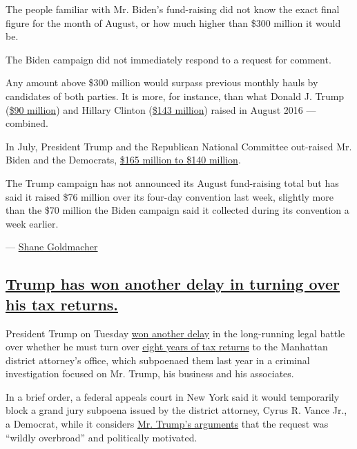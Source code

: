 The people familiar with Mr. Biden's fund-raising did not know the exact
final figure for the month of August, or how much higher than \$300
million it would be.

The Biden campaign did not immediately respond to a request for comment.

Any amount above \$300 million would surpass previous monthly hauls by
candidates of both parties. It is more, for instance, than what Donald
J. Trump
(\href{https://www.politico.com/story/2016/09/trump-august-fundraising-totals-227847}{\$90
million}) and Hillary Clinton
(\href{https://www.nytimes3xbfgragh.onion/2016/09/02/us/politics/hillary-clinton-fundraising.html}{\$143
million}) raised in August 2016 --- combined.

In July, President Trump and the Republican National Committee
out-raised Mr. Biden and the Democrats,
\href{https://www.nytimes3xbfgragh.onion/2020/08/05/us/politics/trump-biden-campaign-finance.html}{\$165
million to \$140 million}.

The Trump campaign has not announced its August fund-raising total but
has said it raised \$76 million over its four-day convention last week,
slightly more than the \$70 million the Biden campaign said it collected
during its convention a week earlier.

--- \href{https://www.nytimes3xbfgragh.onion/by/shane-goldmacher}{Shane
Goldmacher}

\hypertarget{trump-has-won-another-delay-in-turning-over-his-tax-returns}{%
\subsection{\texorpdfstring{\protect\hyperlink{trump-has-won-another-delay-in-turning-over-his-tax-returns}{Trump
has won another delay in turning over his tax
returns.}}{Trump has won another delay in turning over his tax returns.}}\label{trump-has-won-another-delay-in-turning-over-his-tax-returns}}

President Trump on Tuesday
\href{https://www.nytimes3xbfgragh.onion/2020/09/01/nyregion/trump-taxes-vance-lawsuit.html}{won
another delay} in the long-running legal battle over whether he must
turn over
\href{https://www.nytimes3xbfgragh.onion/2019/09/16/nyregion/trump-tax-returns-cy-vance.html}{eight
years of tax returns} to the Manhattan district attorney's office, which
subpoenaed them last year in a criminal investigation focused on Mr.
Trump, his business and his associates.

In a brief order, a federal appeals court in New York said it would
temporarily block a grand jury subpoena issued by the district attorney,
Cyrus R. Vance Jr., a Democrat, while it considers
\href{https://www.nytimes3xbfgragh.onion/2020/08/20/nyregion/donald-trump-taxes-cyrus-vance.html}{Mr.
Trump's arguments} that the request was ``wildly overbroad'' and
politically motivated.


